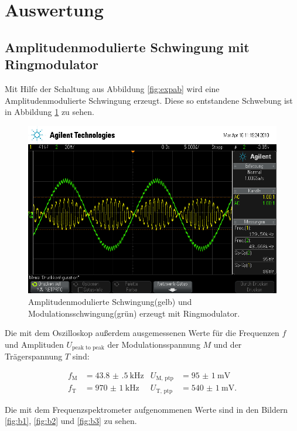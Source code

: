 \section{Auswertung}
\label{sec:Auswertung}

\listoftodos

\subsection{Amplitudenmodulierte Schwingung mit Ringmodulator}

Mit Hilfe der Schaltung aus Abbildung \ref{fig:expab} wird eine Amplitudenmodulierte Schwingung erzeugt.
Diese so entstandene Schwebung ist in Abbildung \ref{fig:amplModOszi} zu sehen.

\begin{figure}[h]
  \centering
  \includegraphics[width=.9\textwidth]{Oszi_Pics/amplModRing.png}
  \caption{Amplitudenmodulierte Schwingung(gelb) und Modulationsschwingung(grün) erzeugt mit Ringmodulator.}
  \label{fig:amplModOszi}
\end{figure}

Die mit dem Oszilloskop außerdem ausgemessenen Werte für die Frequenzen $f$ und Amplituden $U_\text{peak to peak}$ der Modulationsspannung $M$ und der Trägerspannung $T$ sind:

\begin{align*}
  f_\text{M} &= \SI{43.8(5)}{\kilo\hertz} & U_\text{M, ptp} &= \SI{95(1)}{\milli\volt}\\
  f_\text{T} &= \SI{970(1)}{\kilo\hertz} & U_\text{T, ptp} &= \SI{540(1)}{\milli\volt}.
\end{align*}

Die mit dem Frequenzspektrometer aufgenommenen Werte sind in den Bildern \ref{fig:b1}, \ref{fig:b2} und \ref{fig:b3} zu sehen.

